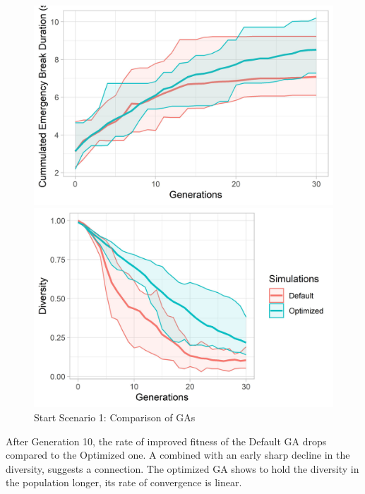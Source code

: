 \begin{figure}[ht] 
	\label{figure:sim_1_ga_comparison}
	\begin{minipage}[b]{0.5\linewidth}
		\centering
		\includegraphics[width=1\linewidth]{simulations/evaluation/plots/sim_1_ga_generations} 
	\end{minipage}%
	\begin{minipage}[b]{0.5\linewidth}
		\centering
		\includegraphics[width=1\linewidth]{simulations/evaluation/plots/sim_1_ga_diversity} 
	\end{minipage} 
	\caption{Start Scenario 1: Comparison of GAs}
\end{figure}

After Generation 10, the rate of improved fitness of the Default GA drops compared to the Optimized one. A combined with an early sharp decline in the diversity, suggests a connection. The optimized GA shows to hold the diversity in the population longer, its rate of convergence is linear.



